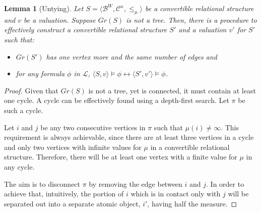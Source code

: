 \documentclass{article}
\newtheorem*{lemma}{Lemma}
\newcommand{\B}{\mathcal{B}}
\newcommand{\lang}{\mathcal{L}}
\begin{document}
\begin{lemma}[Untying]
  Let $S = \langle \B^W, \mathcal{C}^\kappa, \leq_\mu \rangle$ be a convertible relational structure and $v$ be a valuation. Suppose $Gr(S)$ is not a tree.
  Then, there is a procedure to effectively construct a convertible relational structure $S'$ and a valuation $v'$ for $S'$ such that:
  \begin{itemize}
  \item $Gr(S')$ has one vertex more and the same number of edges and
  \item for any formula $\phi$ in $\lang$, $\langle S, v \rangle \models \phi \leftrightarrow \langle S', v' \rangle \models \phi$.
  \end{itemize}
\end{lemma}
\begin{proof}
  Given that $Gr(S)$ is not a tree, yet is connected, it must contain at least one cycle. A cycle can be effectively found using a depth-first search. Let $\pi$ be such a cycle.

  Let $i$ and $j$ be any two consecutive vertices in $\pi$ such that $\mu(i) \neq \infty$. This requirement is always achievable, since there are at least three vertices in a cycle and only two vertices with infinite values for $\mu$ in a convertible relational structure. Therefore, there will be at least one vertex with a finite value for $\mu$ in any cycle.

  The aim is to disconnect $\pi$ by removing the edge between $i$ and $j$. In order to achieve that, intuitively, the portion of $i$ which is in contact only with $j$ will be separated out into a separate atomic object, $i'$, having half the measure.


\end{proof}
\end{document}
